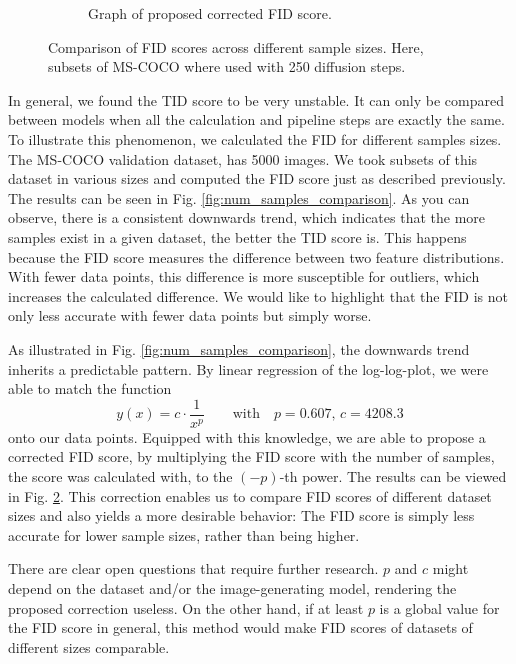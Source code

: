 \documentclass[11pt]{article}
\begin{document}
\begin{figure}
\begin{subfigure}{0.49\textwidth}
        \caption{Graph of proposed corrected FID score.}
        \label{fig:num_samples_comparison_corrected}
    \end{subfigure}
    \caption{Comparison of FID scores across different sample sizes. Here, subsets of MS-COCO where used with 250 diffusion steps.}
\end{figure}

In general, we found the TID score to be very unstable. It can only be compared between models when all the calculation and pipeline steps are exactly the same. To illustrate this phenomenon, we calculated the FID for different samples sizes. The MS-COCO validation dataset, has 5000 images. We took subsets of this dataset in various sizes and computed the FID score just as described previously. The results can be seen in Fig. \ref{fig:num_samples_comparison}. As you can observe, there is a consistent downwards trend, which indicates that the more samples exist in a given dataset, the better the TID score is. This happens because the FID score measures the difference between two feature distributions. With fewer data points, this difference is more susceptible for outliers, which increases the calculated difference. We would like to highlight that the FID is not only less accurate with fewer data points but simply worse.

As illustrated in Fig. \ref{fig:num_samples_comparison}, the downwards trend inherits a predictable pattern. By linear regression of the log-log-plot, we were able to match the function
$$ y(x) = c\cdot \frac{1}{x^p} \qquad\mathrm{with}\quad p = 0.607,\, c = 4208.3$$
onto our data points. Equipped with this knowledge, we are able to propose a corrected FID score, by multiplying the FID score with the number of samples, the score was calculated with, to the $(-p)$-th power. The results can be viewed in Fig. \ref{fig:num_samples_comparison_corrected}. This correction enables us to compare FID scores of different dataset sizes and also yields a more desirable behavior: The FID score is simply less accurate for lower sample sizes, rather than being higher.

There are clear open questions that require further research. $p$ and $c$ might depend on the dataset and/or the image-generating model, rendering the proposed correction useless. On the other hand, if at least $p$ is a global value for the FID score in general, this method would make FID scores of datasets of different sizes comparable.
\end{document}
